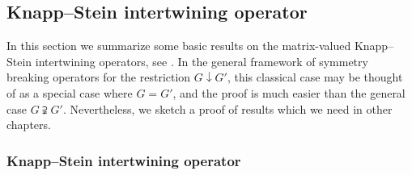 \subsection{Knapp--Stein intertwining operator}
\label{sec:KS}


In this section
 we summarize some basic results
 on the matrix-valued Knapp--Stein intertwining operators, 
 see \cite{KS, KS2}.  
In the general framework of symmetry breaking operators
 for the restriction $G \downarrow G'$, 
 this classical case may be thought of as a special case
 where $G=G'$, 
 and the proof is much easier than the general case 
 $G \supsetneqq G'$.  
Nevertheless, 
 we sketch a proof 
 of results which we need
 in other chapters.  


\subsubsection{Knapp--Stein intertwining operator}
\label{subsec:KerKS}

